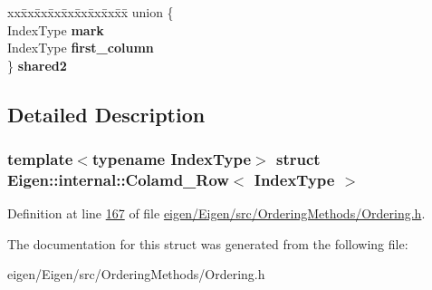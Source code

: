 \begin{DoxyCompactItemize}
\begin{tabbing}
\end{tabbing}\item 
\mbox{\label{struct_eigen_1_1internal_1_1_colamd___row_a828dcfc27eed67cdf832b2420cec512c}} 
\begin{tabbing}
xx\=xx\=xx\=xx\=xx\=xx\=xx\=xx\=xx\=\kill
union \{\\
\>IndexType {\bfseries mark}\\
\>IndexType {\bfseries first\_column}\\
\} {\bfseries shared2}\\

\end{tabbing}\end{DoxyCompactItemize}


\subsection{Detailed Description}
\subsubsection*{template$<$typename Index\+Type$>$\newline
struct Eigen\+::internal\+::\+Colamd\+\_\+\+Row$<$ Index\+Type $>$}



Definition at line \hyperlink{eigen_2_eigen_2src_2_ordering_methods_2_ordering_8h_source_l00167}{167} of file \hyperlink{eigen_2_eigen_2src_2_ordering_methods_2_ordering_8h_source}{eigen/\+Eigen/src/\+Ordering\+Methods/\+Ordering.\+h}.



The documentation for this struct was generated from the following file\+:\begin{DoxyCompactItemize}
\item 
eigen/\+Eigen/src/\+Ordering\+Methods/\+Ordering.\+h\end{DoxyCompactItemize}

